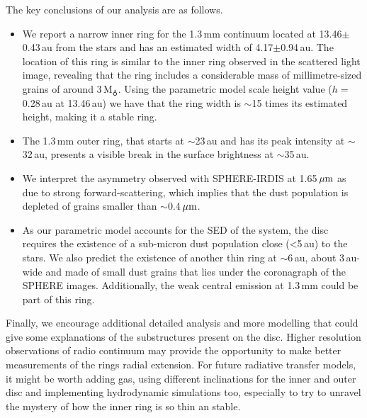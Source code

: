 \documentclass[letters, usenatbib]{mnras}
\begin{document}
The key conclusions of our analysis are as follows.
\begin{itemize}
  \item We report a narrow inner ring for the 1.3\,mm continuum located at 13.46$\pm$0.43\,au from the stars and has an estimated width of 4.17$\pm$0.94\,au. The location of this ring is similar to the inner ring observed in the scattered light image, revealing that the ring includes a considerable mass of millimetre-sized grains of around 3\,M$_{\earth}$. Using the parametric model scale height value ($h= $ 0.28\,au at 13.46\,au) we have that the ring width is $\sim$15 times its estimated height, making it a stable ring.
  
  \item The 1.3\,mm outer ring, that starts at $\sim$23\,au and has its peak intensity at $\sim$32\,au, presents a visible break in the surface brightness at $\sim$35\,au. 
  
  
  \item We interpret the asymmetry observed with SPHERE-IRDIS at 1.65\,$\hbox{$\mu$m}$ as due to strong forward-scattering, which implies that the dust population is depleted of grains smaller than $\sim$0.4\,$\hbox{$\mu$m}$.
  
  \item As our parametric model accounts for the SED of the system, the disc requires the existence of a sub-micron dust population close (<5\,au) to the stars. We also predict the existence of another thin ring at $\sim$6\,au, about 3\,au-wide and made of small dust grains that lies under the coronagraph of the SPHERE images. Additionally, the weak central emission at 1.3\,mm could be part of this ring.
  
\end{itemize}

Finally, we encourage additional detailed analysis and more modelling that could give some explanations of the substructures present on the disc. Higher resolution observations of radio continuum may provide the opportunity to make better measurements of the rings radial extension. For future radiative transfer models, it might be worth adding gas, using different inclinations for the inner and outer disc and implementing hydrodynamic simulations too, especially to try to unravel the mystery of how the inner ring is so thin an stable. 
\end{document}
